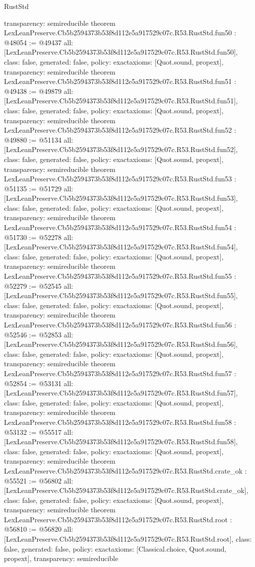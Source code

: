 \begin{lexlean}{RustStd}
\begin{coremodule}
{  transparency: semireducible
}
theorem LexLeanPreserve.Cb5b2594373b53f8d112e5a917529c07c.R53.RustStd.fun50 : @48054 := @49437 {
  all: [LexLeanPreserve.Cb5b2594373b53f8d112e5a917529c07c.R53.RustStd.fun50],
  class: false,
  generated: false,
  policy: exact{axioms: [Quot.sound, propext]},
  transparency: semireducible
}
theorem LexLeanPreserve.Cb5b2594373b53f8d112e5a917529c07c.R53.RustStd.fun51 : @49438 := @49879 {
  all: [LexLeanPreserve.Cb5b2594373b53f8d112e5a917529c07c.R53.RustStd.fun51],
  class: false,
  generated: false,
  policy: exact{axioms: [Quot.sound, propext]},
  transparency: semireducible
}
theorem LexLeanPreserve.Cb5b2594373b53f8d112e5a917529c07c.R53.RustStd.fun52 : @49880 := @51134 {
  all: [LexLeanPreserve.Cb5b2594373b53f8d112e5a917529c07c.R53.RustStd.fun52],
  class: false,
  generated: false,
  policy: exact{axioms: [Quot.sound, propext]},
  transparency: semireducible
}
theorem LexLeanPreserve.Cb5b2594373b53f8d112e5a917529c07c.R53.RustStd.fun53 : @51135 := @51729 {
  all: [LexLeanPreserve.Cb5b2594373b53f8d112e5a917529c07c.R53.RustStd.fun53],
  class: false,
  generated: false,
  policy: exact{axioms: [Quot.sound, propext]},
  transparency: semireducible
}
theorem LexLeanPreserve.Cb5b2594373b53f8d112e5a917529c07c.R53.RustStd.fun54 : @51730 := @52278 {
  all: [LexLeanPreserve.Cb5b2594373b53f8d112e5a917529c07c.R53.RustStd.fun54],
  class: false,
  generated: false,
  policy: exact{axioms: [Quot.sound, propext]},
  transparency: semireducible
}
theorem LexLeanPreserve.Cb5b2594373b53f8d112e5a917529c07c.R53.RustStd.fun55 : @52279 := @52545 {
  all: [LexLeanPreserve.Cb5b2594373b53f8d112e5a917529c07c.R53.RustStd.fun55],
  class: false,
  generated: false,
  policy: exact{axioms: [Quot.sound, propext]},
  transparency: semireducible
}
theorem LexLeanPreserve.Cb5b2594373b53f8d112e5a917529c07c.R53.RustStd.fun56 : @52546 := @52853 {
  all: [LexLeanPreserve.Cb5b2594373b53f8d112e5a917529c07c.R53.RustStd.fun56],
  class: false,
  generated: false,
  policy: exact{axioms: [Quot.sound, propext]},
  transparency: semireducible
}
theorem LexLeanPreserve.Cb5b2594373b53f8d112e5a917529c07c.R53.RustStd.fun57 : @52854 := @53131 {
  all: [LexLeanPreserve.Cb5b2594373b53f8d112e5a917529c07c.R53.RustStd.fun57],
  class: false,
  generated: false,
  policy: exact{axioms: [Quot.sound, propext]},
  transparency: semireducible
}
theorem LexLeanPreserve.Cb5b2594373b53f8d112e5a917529c07c.R53.RustStd.fun58 : @53132 := @55517 {
  all: [LexLeanPreserve.Cb5b2594373b53f8d112e5a917529c07c.R53.RustStd.fun58],
  class: false,
  generated: false,
  policy: exact{axioms: [Quot.sound, propext]},
  transparency: semireducible
}
theorem LexLeanPreserve.Cb5b2594373b53f8d112e5a917529c07c.R53.RustStd.crate_ok : @55521 := @56802 {
  all: [LexLeanPreserve.Cb5b2594373b53f8d112e5a917529c07c.R53.RustStd.crate_ok],
  class: false,
  generated: false,
  policy: exact{axioms: [Quot.sound, propext]},
  transparency: semireducible
}
theorem LexLeanPreserve.Cb5b2594373b53f8d112e5a917529c07c.R53.RustStd.root : @56810 := @56820 {
  all: [LexLeanPreserve.Cb5b2594373b53f8d112e5a917529c07c.R53.RustStd.root],
  class: false,
  generated: false,
  policy: exact{axioms: [Classical.choice, Quot.sound, propext]},
  transparency: semireducible
}


\end{coremodule}
\end{lexlean}

